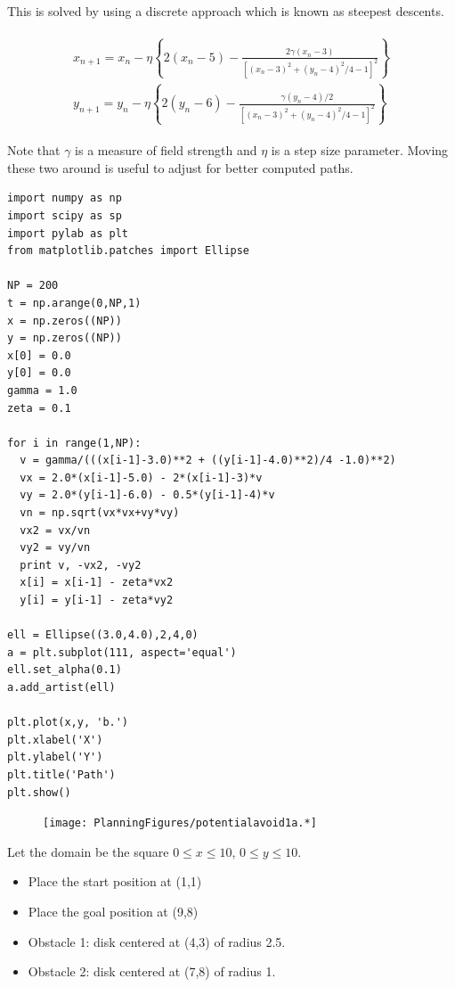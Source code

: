 This is solved by using a discrete approach which is known as steepest
descents.

\[\begin{aligned}
\begin{array}{l}
\displaystyle x_{n+1} = x_n  - \eta\left\{2(x_n-5) - \frac{2\gamma(x_n-3)}{[(x_n-3)^2 + (y_n-4)^2/4 - 1]^{2}}\right\}\\[10pt]
\displaystyle y_{n+1} = y_n -   \eta\left\{2(y_n-6) - \frac{\gamma(y_n-4)/2}{[(x_n-3)^2 + (y_n-4)^2/4 - 1]^{2}}\right\}
\end{array}
\end{aligned}\]

Note that \(\gamma\) is a measure of field strength and \(\eta\) is a
step size parameter. Moving these two around is useful to adjust for
better computed paths.

\begin{verbatim}
import numpy as np
import scipy as sp
import pylab as plt
from matplotlib.patches import Ellipse

NP = 200
t = np.arange(0,NP,1)
x = np.zeros((NP))
y = np.zeros((NP))
x[0] = 0.0
y[0] = 0.0
gamma = 1.0
zeta = 0.1

for i in range(1,NP):
  v = gamma/(((x[i-1]-3.0)**2 + ((y[i-1]-4.0)**2)/4 -1.0)**2)
  vx = 2.0*(x[i-1]-5.0) - 2*(x[i-1]-3)*v
  vy = 2.0*(y[i-1]-6.0) - 0.5*(y[i-1]-4)*v
  vn = np.sqrt(vx*vx+vy*vy)
  vx2 = vx/vn
  vy2 = vy/vn
  print v, -vx2, -vy2
  x[i] = x[i-1] - zeta*vx2
  y[i] = y[i-1] - zeta*vy2

ell = Ellipse((3.0,4.0),2,4,0)
a = plt.subplot(111, aspect='equal')
ell.set_alpha(0.1)
a.add_artist(ell)

plt.plot(x,y, 'b.')
plt.xlabel('X')
plt.ylabel('Y')
plt.title('Path')
plt.show()
\end{verbatim}

\begin{figure}
\centering
\texttt{[image: PlanningFigures/potentialavoid1a.*]}
\caption{}
\end{figure}

Let the domain be the square \(0\leq x \leq 10\), \(0\leq y \leq 10\).

\begin{itemize}
\tightlist
\item
  Place the start position at (1,1)
\item
  Place the goal position at (9,8)
\item
  Obstacle 1: disk centered at (4,3) of radius 2.5.
\item
  Obstacle 2: disk centered at (7,8) of radius 1.
\end{itemize}

